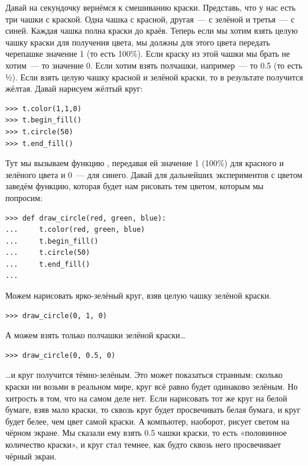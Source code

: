 Давай на секундочку вернёмся к смешиванию краски. Представь, что у нас есть три чашки с краской. Одна чашка с красной, другая — с зелёной и третья — с синей. Каждая чашка полна краски до краёв. Теперь если мы хотим взять целую чашку краски для получения цвета, мы должны для этого цвета передать черепашке значение 1 (то есть 100\%). Если краску из этой чашки мы брать не хотим — то значение 0. Если хотим взять полчашки, например — то 0.5 (то есть ½). Если взять целую чашку красной и зелёной краски, то в результате получится жёлтая. Давай нарисуем жёлтый круг:

\begin{listing}
\begin{verbatim}
>>> t.color(1,1,0)
>>> t.begin_fill()
>>> t.circle(50)
>>> t.end_fill()
\end{verbatim}
\end{listing}

Тут мы вызываем функцию , передавая ей значение 1 (100\%) для красного и зелёного цвета и 0 — для синего. Давай для дальнейших экспериментов с цветом заведём функцию, которая будет нам рисовать тем цветом, которым мы попросим:

\begin{listing}
\begin{verbatim}
>>> def draw_circle(red, green, blue):
...     t.color(red, green, blue)
...     t.begin_fill()
...     t.circle(50)
...     t.end_fill()
...
\end{verbatim}
\end{listing}

Можем нарисовать ярко-зелёный круг, взяв целую чашку зелёной краски.

\begin{listing}
\begin{verbatim}
>>> draw_circle(0, 1, 0)
\end{verbatim}
\end{listing}

А можем взять только полчашки зелёной краски…

\begin{listing}
\begin{verbatim}
>>> draw_circle(0, 0.5, 0)
\end{verbatim}
\end{listing}

…и круг получится тёмно-зелёным. Это может показаться странным: сколько краски ни возьми в реальном мире, круг всё равно будет одинаково зелёным. Но хитрость в том, что на самом деле нет. Если нарисовать тот же круг на белой бумаге, взяв мало краски, то сквозь круг будет просвечивать белая бумага, и круг будет белее, чем цвет самой краски. А компьютер, наоборот, рисует светом на чёрном экране. Мы сказали ему взять 0.5 чашки краски, то есть «половинное количество краски», и круг стал темнее, как будто сквозь него просвечивает чёрный экран.

